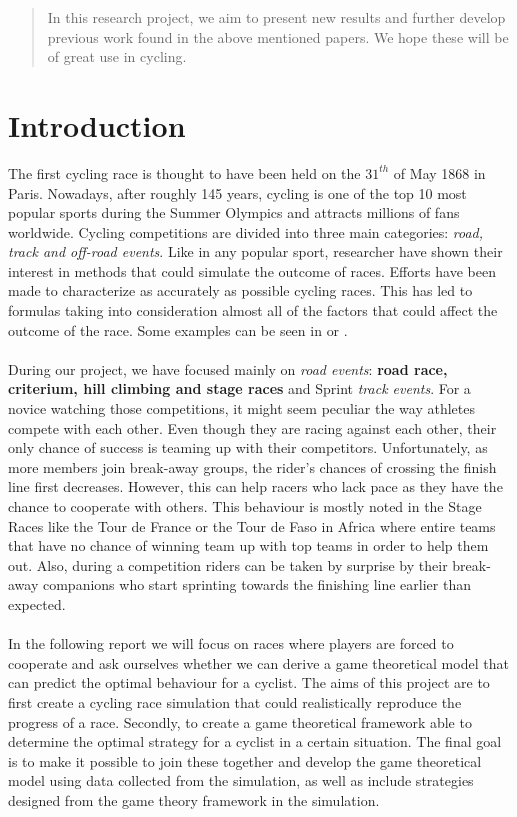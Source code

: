 \documentclass[10pt, a4paper]{report}
\begin{document}
\begin{abstract}
In this research project, we aim to present new results and further develop previous work found in the above mentioned papers. We hope these will be of great use in cycling.
\end{abstract}


\chapter{Introduction}\label{ch:intro}

The first cycling race is thought to have been held on the $31^{th}$ of May 1868 in Paris. Nowadays, after roughly 145 years, cycling is one of the top 10 most popular sports during the Summer Olympics \cite{TopEndSportsUrl} and attracts millions of fans worldwide. Cycling competitions are divided into three main categories: \textit{road, track and off-road events}. Like in any popular sport, researcher have shown their interest in methods that could simulate the outcome of races. Efforts have been made to characterize as accurately as possible cycling races. This has led to formulas taking into consideration almost all of the factors that could affect the outcome of the race. Some examples can be seen in \cite{AgentModel} or \cite{SlipStream} .
\\\\
During our project, we have focused mainly on \textit{road events}: \textbf{road race, criterium, hill climbing and stage races} and Sprint \textit{track events}. For a novice watching those competitions, it might seem peculiar the way athletes compete with each other. Even though they are racing against each other, their only chance of success is teaming up with their competitors. Unfortunately, as more members join break-away groups, the rider's chances of crossing the finish line first decreases. However, this can help racers who lack pace as they have the chance to cooperate with others. This behaviour is mostly noted in the Stage Races like the Tour de France or the Tour de Faso in Africa where entire teams that have no chance of winning team up with top teams in order to help them out. Also, during a competition riders can be taken by surprise by their break-away companions who start sprinting towards the finishing line earlier than expected.
\\\\
In the following report we will focus on races where players are forced to cooperate and ask ourselves whether we can derive a game theoretical model that can predict the optimal behaviour for a cyclist. The aims of this project are to first create a cycling race simulation that could realistically reproduce the progress of a race. Secondly, to create a game theoretical framework able to determine the optimal strategy for a cyclist in a certain situation. The final goal is to make it possible to join these together and develop the game theoretical model using data collected from the simulation, as well as include strategies designed from the game theory framework in the simulation.
\end{document}
